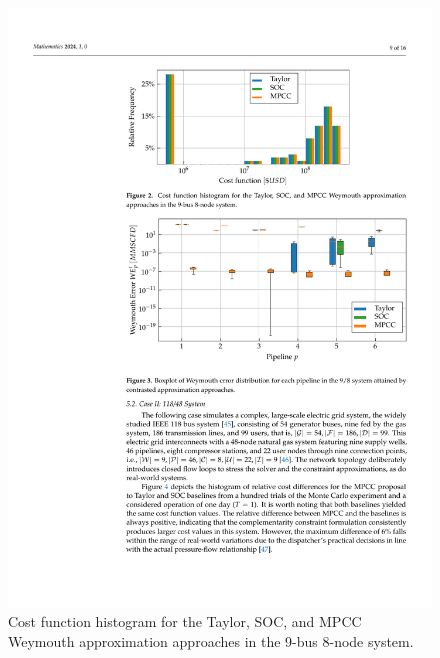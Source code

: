 \begin{figure}[H]
    \centering
    \includegraphics[scale=1]{figures/Chapter_MPCC/g001.pdf}
    \caption{Cost function histogram for the Taylor, SOC, and MPCC Weymouth approximation approaches in the 9-bus 8-node system.}
    \label{fig:blue_test_cost}
\end{figure}

